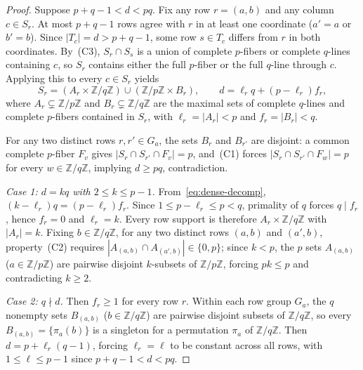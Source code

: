 \documentclass[11pt,reqno]{amsart}
\numberwithin{equation}{section}
\theoremstyle{definition}
\theoremstyle{remark}
\newcommand{\Z}{\mathbb{Z}}
\begin{document}
\begin{proof}
Suppose $p+q-1<d<pq$. Fix any row $r=(a,b)$ and any column $c\in S_r$. At most $p+q-1$ rows agree with $r$ in at least one coordinate ($a'=a$ or $b'=b$). Since $|T_c|=d>p+q-1$, some row $s\in T_c$ differs from $r$ in both coordinates. By~(C3), $S_r\cap S_s$ is a union of complete $p$-fibers or complete $q$-lines containing $c$, so $S_r$ contains either the full $p$-fiber or the full $q$-line through $c$. Applying this to every $c\in S_r$ yields
\begin{equation}
\label{eq:dense-decomp}
S_r = (A_r\times\Z/q\Z)\cup(\Z/p\Z\times B_r),\qquad
d = \ell_r q + (p-\ell_r)f_r,
\end{equation}
where $A_r\subsetneq\Z/p\Z$ and $B_r\subsetneq\Z/q\Z$ are the maximal sets of complete $q$-lines and complete $p$-fibers contained in $S_r$, with $\ell_r=|A_r|<p$ and $f_r=|B_r|<q$.

For any two distinct rows $r,r'\in G_a$, the sets $B_r$ and $B_{r'}$ are disjoint: a common complete $p$-fiber $F_v$ gives $|S_r\cap S_{r'}\cap F_v|=p$, and~(C1) forces $|S_r\cap S_{r'}\cap F_w|=p$ for every $w\in\Z/q\Z$, implying $d\ge pq$, contradiction.

\smallskip
\noindent\emph{Case 1: $d=kq$ with $2\le k\le p-1$.} From~\eqref{eq:dense-decomp}, $(k-\ell_r)q=(p-\ell_r)f_r$. Since $1\le p-\ell_r\le p<q$, primality of $q$ forces $q\mid f_r$, hence $f_r=0$ and $\ell_r=k$. Every row support is therefore $A_r\times\Z/q\Z$ with $|A_r|=k$. Fixing $b\in\Z/q\Z$, for any two distinct rows $(a,b)$ and $(a',b)$, property~(C2) requires $|A_{(a,b)}\cap A_{(a',b)}|\in\{0,p\}$; since $k<p$, the $p$ sets $A_{(a,b)}$ ($a\in\Z/p\Z$) are pairwise disjoint $k$-subsets of $\Z/p\Z$, forcing $pk\le p$ and contradicting $k\ge 2$.

\smallskip
\noindent\emph{Case 2: $q\nmid d$.} Then $f_r\ge 1$ for every row $r$. Within each row group $G_a$, the $q$ nonempty sets $B_{(a,b)}$ ($b\in\Z/q\Z$) are pairwise disjoint subsets of $\Z/q\Z$, so every $B_{(a,b)}=\{\pi_a(b)\}$ is a singleton for a permutation $\pi_a$ of $\Z/q\Z$. Then $d = p + \ell_r(q-1)$, forcing $\ell_r=\ell$ to be constant across all rows, with $1\le\ell\le p-1$ since $p+q-1<d<pq$.


\end{proof}
\end{document}
